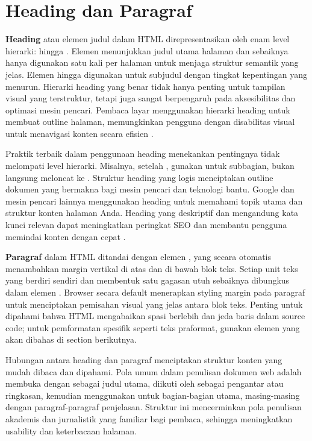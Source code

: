 \section{Heading dan Paragraf}

\textbf{Heading} atau elemen judul dalam HTML direpresentasikan oleh enam level hierarki:  hingga . Elemen  menunjukkan judul utama halaman dan sebaiknya hanya digunakan satu kali per halaman untuk menjaga struktur semantik yang jelas. Elemen  hingga  digunakan untuk subjudul dengan tingkat kepentingan yang menurun. Hierarki heading yang benar tidak hanya penting untuk tampilan visual yang terstruktur, tetapi juga sangat berpengaruh pada aksesibilitas dan optimasi mesin pencari. Pembaca layar menggunakan hierarki heading untuk membuat outline halaman, memungkinkan pengguna dengan disabilitas visual untuk menavigasi konten secara efisien \cite{webdevHtml}.

Praktik terbaik dalam penggunaan heading menekankan pentingnya tidak melompati level hierarki. Misalnya, setelah , gunakan  untuk subbagian, bukan langsung meloncat ke . Struktur heading yang logis menciptakan outline dokumen yang bermakna bagi mesin pencari dan teknologi bantu. Google dan mesin pencari lainnya menggunakan heading untuk memahami topik utama dan struktur konten halaman Anda. Heading yang deskriptif dan mengandung kata kunci relevan dapat meningkatkan peringkat SEO dan membantu pengguna memindai konten dengan cepat \cite{mdnAccessibility}.

\textbf{Paragraf} dalam HTML ditandai dengan elemen , yang secara otomatis menambahkan margin vertikal di atas dan di bawah blok teks. Setiap unit teks yang berdiri sendiri dan membentuk satu gagasan utuh sebaiknya dibungkus dalam elemen . Browser secara default menerapkan styling margin pada paragraf untuk menciptakan pemisahan visual yang jelas antara blok teks. Penting untuk dipahami bahwa HTML mengabaikan spasi berlebih dan jeda baris dalam source code; untuk pemformatan spesifik seperti teks praformat, gunakan elemen  yang akan dibahas di section berikutnya.

Hubungan antara heading dan paragraf menciptakan struktur konten yang mudah dibaca dan dipahami. Pola umum dalam penulisan dokumen web adalah membuka dengan  sebagai judul utama, diikuti oleh  sebagai pengantar atau ringkasan, kemudian menggunakan  untuk bagian-bagian utama, masing-masing dengan paragraf-paragraf penjelasan. Struktur ini mencerminkan pola penulisan akademis dan jurnalistik yang familiar bagi pembaca, sehingga meningkatkan usability dan keterbacaan halaman.

